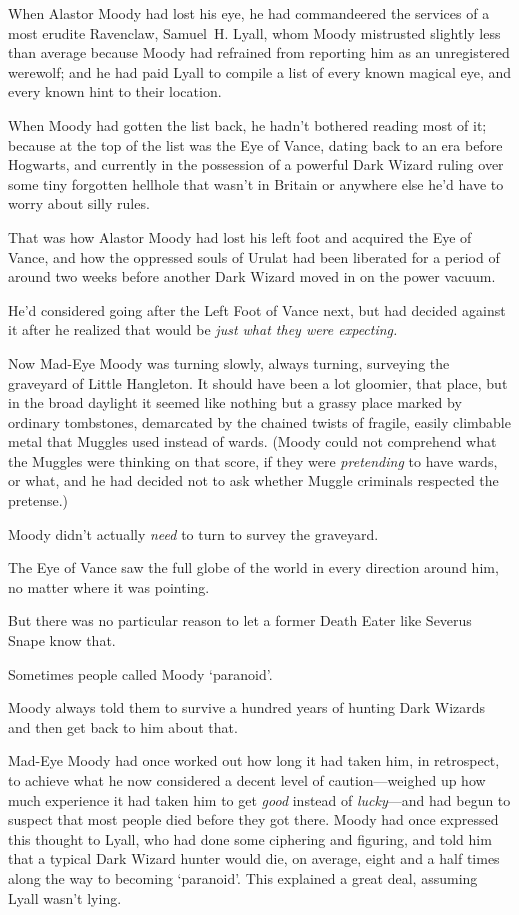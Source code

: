 When Alastor Moody had lost his eye, he had commandeered the services of a most
erudite Ravenclaw, Samuel~H. Lyall, whom Moody mistrusted slightly less than
average because Moody had refrained from reporting him as an unregistered
werewolf; and he had paid Lyall to compile a list of every known magical eye,
and every known hint to their location.

When Moody had gotten the list back, he hadn't bothered reading most of it;
because at the top of the list was the Eye of Vance, dating back to an era
before Hogwarts, and currently in the possession of a powerful Dark Wizard
ruling over some tiny forgotten hellhole that wasn't in Britain or anywhere
else he'd have to worry about silly rules.

That was how Alastor Moody had lost his left foot and acquired the Eye of
Vance, and how the oppressed souls of Urulat had been liberated for a period of
around two weeks before another Dark Wizard moved in on the power vacuum.

He'd considered going after the Left Foot of Vance next, but had decided
against it after he realized that would be \emph{just what they were expecting.}

Now Mad-Eye Moody was turning slowly, always turning, surveying the graveyard
of Little Hangleton. It should have been a lot gloomier, that place, but in the
broad daylight it seemed like nothing but a grassy place marked by ordinary
tombstones, demarcated by the chained twists of fragile, easily climbable metal
that Muggles used instead of wards. (Moody could not comprehend what the
Muggles were thinking on that score, if they were \emph{pretending} to have
wards, or what, and he had decided not to ask whether Muggle criminals
respected the pretense.)

Moody didn't actually \emph{need} to turn to survey the graveyard.

The Eye of Vance saw the full globe of the world in every direction around him,
no matter where it was pointing.

But there was no particular reason to let a former Death Eater like Severus
Snape know that.

Sometimes people called Moody `paranoid'.

Moody always told them to survive a hundred years of hunting Dark Wizards and
then get back to him about that.

Mad-Eye Moody had once worked out how long it had taken him, in retrospect, to
achieve what he now considered a decent level of caution---weighed up how much
experience it had taken him to get \emph{good} instead of \emph{lucky}---and
had begun to suspect that most people died before they got there. Moody had
once expressed this thought to Lyall, who had done some ciphering and figuring,
and told him that a typical Dark Wizard hunter would die, on average, eight and
a half times along the way to becoming `paranoid'. This explained a great deal,
assuming Lyall wasn't lying.

